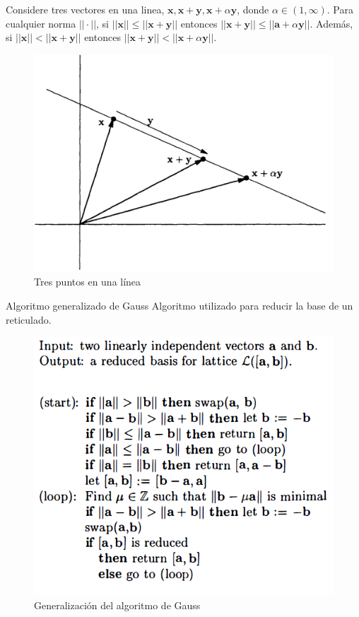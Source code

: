 \begin{frame}
    \begin{lemma}
        Considere tres vectores en una linea, $\textbf{x}, \textbf{x}+\textbf{y}, \textbf{x}+\textbf{$\alpha$} \textbf{y}$, donde $\alpha \in (1, \infty)$. Para cualquier norma $||\cdot||$, si $||\textbf{x}|| \leq ||\textbf{x}+\textbf{y}||$ entonces $||\textbf{x}+\textbf{y}|| \leq ||\textbf{a}+\alpha \textbf{y}||$. Además, si $||\textbf{x}||<||\textbf{x}+\textbf{y}||$ entonces $||\textbf{x}+\textbf{y}||<||\textbf{x}+\alpha \textbf{y}||$.
    \end{lemma}
    \begin{figure}
        \centering
        \includegraphics[width=0.45\linewidth]{figures/lattice_pointsLine.png}
        \caption{Tres puntos en una línea}
    \end{figure}
\end{frame}

\begin{frame}{Algoritmo generalizado de Gauss}
Algoritmo utilizado para reducir la base de un reticulado. 
    \begin{figure}
        \centering
        \includegraphics[width=0.65\linewidth]{figures/lattice_gaussAlg.png}
        \caption{Generalización del algoritmo de Gauss}
    \end{figure}
\end{frame}

